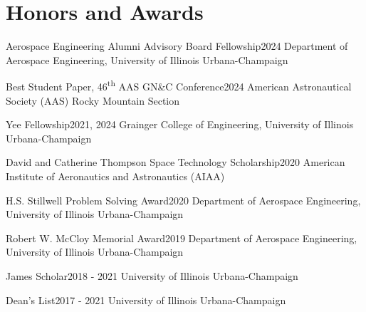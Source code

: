 \documentclass[letterpaper,12pt]{article}
\begin{document}
	\section{Honors and Awards}

	{\setlength{\parskip}{0.25\baselineskip}

	\begin{Awards}
		{Aerospace Engineering Alumni Advisory Board Fellowship}{2024}
		{Department of Aerospace Engineering, University of Illinois Urbana-Champaign}
	\end{Awards}

	\begin{Awards}
		{Best Student Paper, 46\textsuperscript{th} AAS GN\&C Conference}{2024}
		{American Astronautical Society (AAS) Rocky Mountain Section}
	\end{Awards}
	
	\begin{Awards}
		{Yee Fellowship}{2021, 2024}
		{Grainger College of Engineering, University of Illinois Urbana-Champaign}
	\end{Awards}

	\begin{Awards}
		{David and Catherine Thompson Space Technology Scholarship}{2020}
		{American Institute of Aeronautics and Astronautics (AIAA)}
	\end{Awards}

	\begin{Awards}
		{H.S. Stillwell Problem Solving Award}{2020}
		{Department of Aerospace Engineering, University of Illinois Urbana-Champaign}
	\end{Awards}

	\begin{Awards}
		{Robert W. McCloy Memorial Award}{2019}
		{Department of Aerospace Engineering, University of Illinois Urbana-Champaign}
	\end{Awards}

	\begin{Awards}
		{James Scholar}{2018 - 2021}
		{University of Illinois Urbana-Champaign}
	\end{Awards}

	\begin{Awards}
		{Dean's List}{2017 - 2021}
		{University of Illinois Urbana-Champaign}
	\end{Awards}
	
	}
\end{document}
